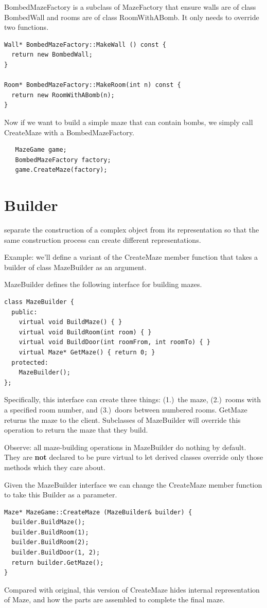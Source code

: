 \documentclass[11pt]{report}
\begin{document}
BombedMazeFactory is a subclass of MazeFactory that ensure walls are of class BombedWall and rooms are 
of class RoomWithABomb. It only needs to override two functions.
\begin{lstlisting}
Wall* BombedMazeFactory::MakeWall () const {
  return new BombedWall;
}

Room* BombedMazeFactory::MakeRoom(int n) const {
  return new RoomWithABomb(n);
}
\end{lstlisting}

Now if we want to build a simple maze that can contain bombs, we simply call CreateMaze with a BombedMazeFactory.
\begin{lstlisting}
   MazeGame game;
   BombedMazeFactory factory;
   game.CreateMaze(factory);
\end{lstlisting}

\section{Builder}

 separate the construction of a complex object from its representation so
that the same construction process can create different representations.

Example: we'll define a variant of the CreateMaze member function that
takes a builder of class MazeBuilder as an argument.

MazeBuilder defines the following interface for building mazes.
\begin{lstlisting}
class MazeBuilder {
  public:
    virtual void BuildMaze() { }
    virtual void BuildRoom(int room) { }
    virtual void BuildDoor(int roomFrom, int roomTo) { }
    virtual Maze* GetMaze() { return 0; }
  protected:
    MazeBuilder();
};
\end{lstlisting}
Specifically, this interface can create three things: (1.)~the maze, (2.)~rooms
with a specified room number, and (3.)~doors between numbered rooms. GetMaze returns the maze
to the client. Subclasses of MazeBuilder will override this operation to return the maze that
they build.

Observe: all maze-building operations in MazeBuilder do nothing by default. They are
{\bf not} declared to be pure virtual to let derived classes override only those methods
which they care about.

Given the MazeBuilder interface we can change the CreateMaze member function to take this Builder as a parameter. 
\begin{lstlisting}
Maze* MazeGame::CreateMaze (MazeBuilder& builder) {
  builder.BuildMaze();
  builder.BuildRoom(1);
  builder.BuildRoom(2);
  builder.BuildDoor(1, 2);
  return builder.GetMaze();
}
\end{lstlisting}
Compared with original, this version of CreateMaze hides internal representation of Maze,
and how the parts are assembled to complete the final maze.  
\end{document}
